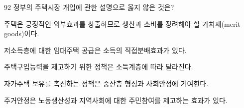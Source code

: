 \begin{question}{92}
정부의 주택시장 개입에 관한 설명으로 옳지 않은 것은?
\begin{choices}
  \item 주택은 긍정적인 외부효과를 창출하므로 생산과 소비를 장려해야 할 가치재(merit goods)이다.
  \item 저소득층에 대한 임대주택 공급은 소득의 직접분배효과가 있다.
  \item 주택구입능력을 제고하기 위한 정책은 소득계층에 따라 달라진다.
  \item 자가주택 보유를 촉진하는 정책은 중산층 형성과 사회안정에 기여한다.
  \item 주거안정은 노동생산성과 지역사회에 대한 주민참여를 제고하는 효과가 있다.
\end{choices}
\end{question}
